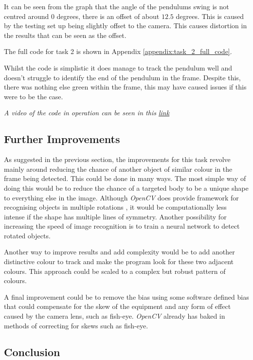 \documentclass[conference]{IEEEtran}
\begin{document}
It can be seen from the graph that the angle of the pendulums swing is not centred around $0$ degrees, there is an offset of about $12.5$ degrees. This is caused by the testing set up being slightly offset to the camera. This causes distortion in the results that can be seen as the offset. 

The full code for task 2 is shown in Appendix \ref{appendix:task_2_full_code}.

Whilst the code is simplistic it does manage to track the pendulum well and doesn't struggle to identify the end of the pendulum in the frame. Despite this, there was nothing else green within the frame, this may have caused issues if this were to be the case. 

\textit{A video of the code in operation can be seen in this \href{https://github.com/LukeDWaller99/Aint308}{link}}

\subsection{Further Improvements}

As suggested in the previous section, the improvements for this task revolve mainly around reducing the chance of another object of similar colour in the frame being detected. This could be done in many ways. The most simple way of doing this would be to reduce the chance of a targeted body to be a unique shape to everything else in the image. Although \textit{OpenCV} does provide framework for recognising objects in multiple rotations \cite{ref:object_orientation}, it would be computationally less intense if the shape has multiple lines of symmetry. Another possibility for increasing the speed of image recognition is to train a neural network to detect rotated objects. \cite{9578190} 

Another way to improve results and add complexity would be to add another distinctive colour to track and make the program look for these two adjacent colours. This approach could be scaled to a complex but robust pattern of colours. 

A final improvement could be to remove the bias using some software defined bias that could compensate for the skew of the equipment and any form of effect caused by the camera lens, such as fish-eye. \textit{OpenCV} already has baked in methods of correcting for skews such as fish-eye. \cite{ref:fish-eye}

\subsection{Conclusion}
\end{document}
